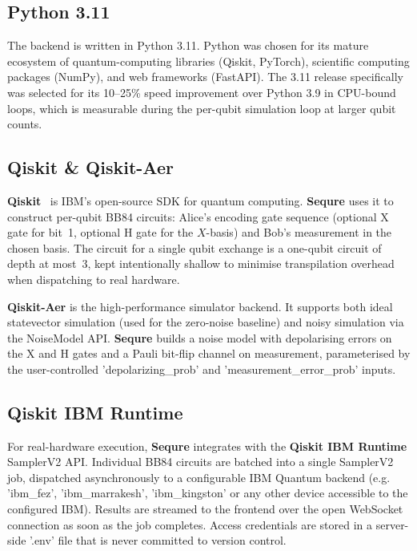 \documentclass[12pt, a4paper]{article}
\begin{document}
\subsection{Python 3.11}
\label{sec:python}

The backend is written in Python 3.11. Python was chosen for its mature
ecosystem of quantum-computing libraries (Qiskit, PyTorch), scientific
computing packages (NumPy), and web frameworks (FastAPI). The 3.11 release
specifically was selected for its 10--25\% speed improvement over Python 3.9
in CPU-bound loops, which is measurable during the per-qubit simulation
loop at larger qubit counts.

\subsection{Qiskit \& Qiskit-Aer}
\label{sec:qiskit}

\textbf{Qiskit}~\cite{qiskit2024} is IBM's open-source SDK for quantum
computing. \textbf{Sequre} uses it to construct per-qubit BB84 circuits: Alice's
encoding gate sequence (optional X gate for bit~1, optional H gate for
the $X$-basis) and Bob's measurement in the chosen basis. The circuit
for a single qubit exchange is a one-qubit circuit of depth at most~3,
kept intentionally shallow to minimise transpilation overhead when
dispatching to real hardware.

\textbf{Qiskit-Aer} is the high-performance simulator backend. It supports
both ideal statevector simulation (used for the zero-noise baseline) and
noisy simulation via the NoiseModel API. \textbf{Sequre} builds a noise
model with depolarising errors on the X and H gates and a Pauli
bit-flip channel on measurement, parameterised by the user-controlled
'depolarizing\_prob' and 'measurement\_error\_prob' inputs.

\subsection{Qiskit IBM Runtime}
\label{sec:ibm-runtime}

For real-hardware execution, \textbf{Sequre} integrates with the
\textbf{Qiskit IBM Runtime} SamplerV2 API. Individual BB84
circuits are batched into a single SamplerV2 job, dispatched
asynchronously to a configurable IBM Quantum backend
(e.g. 'ibm\_fez', 'ibm\_marrakesh', 'ibm\_kingston' or any other device accessible to the configured IBM). Results are streamed to the
frontend over the open WebSocket connection as soon as the job
completes. Access credentials are stored in a server-side '.env'
file that is never committed to version control.
\end{document}

